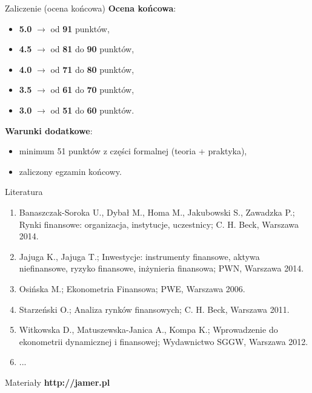 \documentclass[a4paper, 11pt]{beamer}
\begin{document}
	\begin{frame}{Zaliczenie (ocena końcowa)}
		\textbf{Ocena końcowa}:
		\begin{itemize}
			\item \textbf{5.0} $\rightarrow$ od \textbf{91} punktów,
			\item \textbf{4.5} $\rightarrow$ od \textbf{81} do \textbf{90} punktów,
			\item \textbf{4.0} $\rightarrow$ od \textbf{71} do \textbf{80} punktów,
			\item \textbf{3.5} $\rightarrow$ od \textbf{61} do \textbf{70} punktów,
			\item \textbf{3.0} $\rightarrow$ od \textbf{51} do \textbf{60} punktów.
		\end{itemize}
		\textbf{Warunki dodatkowe}:
		\begin{itemize}
			\item minimum 51 punktów z części formalnej (teoria + praktyka),
			\item zaliczony egzamin końcowy.
		\end{itemize}
	\end{frame}
	
	\begin{frame}{Literatura}
		\begin{enumerate}
			\item Banaszczak-Soroka U., Dybał M., Homa M., Jakubowski S., Zawadzka P.; Rynki finansowe: organizacja, instytucje, uczestnicy; C. H. Beck, Warszawa 2014.
			\item Jajuga K., Jajuga T.; Inwestycje: instrumenty finansowe, aktywa niefinansowe, ryzyko finansowe, inżynieria finansowa; PWN, Warszawa 2014.
			\item Osińska M.; Ekonometria Finansowa; PWE, Warszawa 2006.
			\item Starzeński O.; Analiza rynków finansowych; C. H. Beck, Warszawa 2011.
			\item Witkowska D., Matuszewska-Janica A., Kompa K.; Wprowadzenie do ekonometrii dynamicznej i finansowej; Wydawnictwo SGGW, Warszawa 2012.
			\item ...
		\end{enumerate}
	\end{frame}
	
	\begin{frame}{Materiały}
		\Huge\bfseries
		\centering
		http://jamer.pl
	\end{frame}
\end{document}
